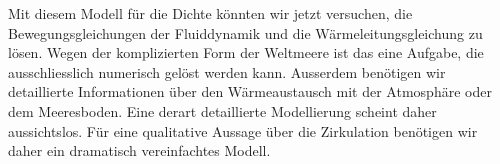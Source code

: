 Mit diesem Modell für die Dichte könnten wir jetzt versuchen, die
Bewegungsgleichungen der Fluiddynamik und die Wärmeleitungsgleichung
zu lösen.
Wegen der komplizierten Form der Weltmeere ist das eine Aufgabe,
die ausschliesslich numerisch gelöst werden kann.
Ausserdem benötigen wir detaillierte Informationen über den Wärmeaustausch
mit der Atmosphäre oder dem Meeresboden.
Eine derart detaillierte Modellierung scheint daher aussichtslos.
Für eine qualitative Aussage über die Zirkulation benötigen wir daher
ein dramatisch vereinfachtes Modell.





